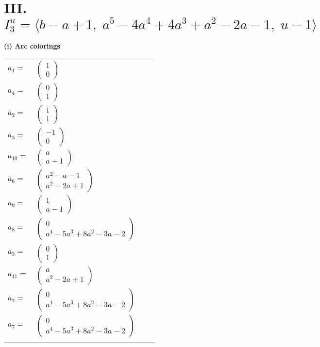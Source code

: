 \documentclass[1p]{elsarticle_modified}
\theoremstyle{definition}
\begin{document}
\centering \section*{III. $I^u_{3}= \langle b- a+1,\;a^5-4 a^4+4 a^3+a^2-2 a-1,\;u-1 \rangle$}
\flushleft \textbf{(i) Arc colorings}\\
\begin{tabular}{m{7pt} m{180pt} m{7pt} m{180pt} }
\flushright $a_{1}=$&$\begin{pmatrix}1\\0\end{pmatrix}$ \\
\flushright $a_{4}=$&$\begin{pmatrix}0\\1\end{pmatrix}$ \\
\flushright $a_{2}=$&$\begin{pmatrix}1\\1\end{pmatrix}$ \\
\flushright $a_{5}=$&$\begin{pmatrix}-1\\0\end{pmatrix}$ \\
\flushright $a_{10}=$&$\begin{pmatrix}a\\a-1\end{pmatrix}$ \\
\flushright $a_{6}=$&$\begin{pmatrix}a^2- a-1\\a^2-2 a+1\end{pmatrix}$ \\
\flushright $a_{9}=$&$\begin{pmatrix}1\\a-1\end{pmatrix}$ \\
\flushright $a_{8}=$&$\begin{pmatrix}0\\a^4-5 a^3+8 a^2-3 a-2\end{pmatrix}$ \\
\flushright $a_{3}=$&$\begin{pmatrix}0\\1\end{pmatrix}$ \\
\flushright $a_{11}=$&$\begin{pmatrix}a\\a^2-2 a+1\end{pmatrix}$ \\
\flushright $a_{7}=$&$\begin{pmatrix}0\\a^4-5 a^3+8 a^2-3 a-2\end{pmatrix}$\\ \flushright $a_{7}=$&$\begin{pmatrix}0\\a^4-5 a^3+8 a^2-3 a-2\end{pmatrix}$\\&\end{tabular}
\end{document}
